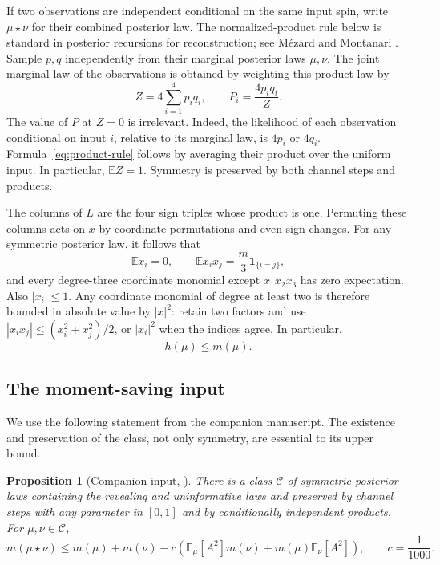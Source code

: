 \documentclass[11pt]{article}
\newtheorem{proposition}[theorem]{Proposition}
\numberwithin{equation}{section}
\newcommand{\E}{\mathbb E}
\newcommand{\calC}{\mathcal C}
\begin{document}
If two observations are independent conditional on the same
input spin, write $\mu\star\nu$ for their combined posterior law.
The normalized-product rule below is standard in posterior
recursions for reconstruction; see M\'ezard and Montanari
\cite[Sections~2.2--2.4]{MM06}.
Sample $p,q$ independently from their marginal posterior laws
$\mu,\nu$. The joint marginal law of the observations is obtained
by weighting this product law by
\begin{equation}\label{eq:product-rule}
 Z=4\sum_{i=1}^4p_iq_i,
 \qquad P_i=\frac{4p_iq_i}{Z}.
\end{equation}
The value of $P$ at $Z=0$ is irrelevant. Indeed, the likelihood
of each observation conditional on input $i$, relative to its
marginal law, is $4p_i$ or $4q_i$. Formula~\eqref{eq:product-rule}
follows by averaging their product over the uniform input.
In particular, $\E Z=1$. Symmetry is preserved by both channel
steps and products.

The columns of $L$ are the four sign triples whose product is
one. Permuting these columns acts on $x$ by coordinate permutations
and even sign changes. For any symmetric posterior law, it follows
that
\begin{equation}\label{eq:symmetric-moments}
 \E x_i=0,\qquad
 \E x_ix_j=\frac{m}{3}\mathbf1_{\{i=j\}},
\end{equation}
and every degree-three coordinate monomial except $x_1x_2x_3$
has zero expectation. Also $|x_i|\leq1$. Any coordinate monomial
of degree at least two is therefore bounded in absolute value
by $|x|^2$: retain two factors and use
$|x_ix_j|\leq(x_i^2+x_j^2)/2$, or $|x_i|^2$ when the indices
agree. In particular,
\begin{equation}\label{eq:h-bound}
 h(\mu)\leq m(\mu).
\end{equation}

\subsection{The moment-saving input}

We use the following statement from the companion manuscript.
The existence and preservation of the class, not only symmetry,
are essential to its upper bound.

\begin{proposition}[Companion input, {\cite[Proposition~3.2 and Equations~(3.8)--(3.9)]{OpenAI26Potts}}]
\label{prop:companion}
There is a class $\calC$ of symmetric posterior laws containing
the revealing and uninformative laws and preserved by channel
steps with any parameter in $[0,1]$ and by conditionally independent
products. For $\mu,\nu\in\calC$,
\begin{equation}\label{eq:moment-saving}
 m(\mu\star\nu)\leq m(\mu)+m(\nu)
 -c\left(\E_\mu[A^2]m(\nu)+m(\mu)\E_\nu[A^2]\right),
 \qquad c=\frac1{1000}.
\end{equation}
\end{proposition}
\end{document}
